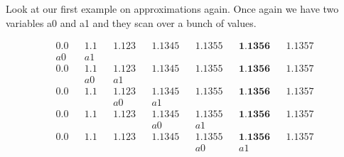 Look at our first example on approximations again. Once again we have
two variables a0 and a1 and they scan over a bunch of values.

\begin{align*}
0.0         &&1.1       &&1.123      &&1.1345      &&1.1355     &&\textbf{1.1356} &&1.1357 \\
a0         &&a1 \\
0.0         &&1.1       &&1.123      &&1.1345      &&1.1355     &&\textbf{1.1356} &&1.1357 \\
&&a0        &&a1 \\
0.0         &&1.1       &&1.123      &&1.1345      &&1.1355     &&\textbf{1.1356} &&1.1357 \\
&&&&a0       &&a1 \\
0.0         &&1.1       &&1.123      &&1.1345      &&1.1355     &&\textbf{1.1356} &&1.1357 \\
&&&&&&a0      &&a1 \\
0.0         &&1.1       &&1.123      &&1.1345      &&1.1355     &&\textbf{1.1356} &&1.1357 \\
&&&&&&&&a0      &&a1 \\
\end{align*}

